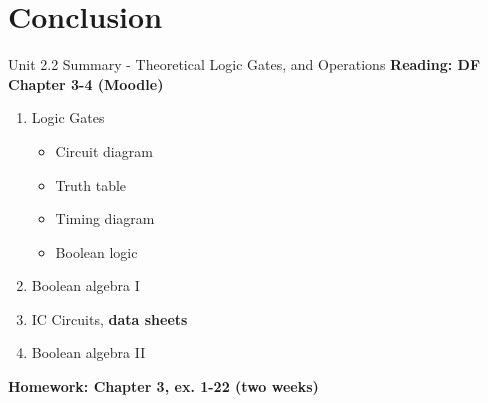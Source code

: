 \documentclass{beamer}
\begin{document}
\section{Conclusion}

\begin{frame}{Unit 2.2 Summary - Theoretical Logic Gates, and Operations}
\textbf{Reading: DF Chapter 3-4 (Moodle)}
\begin{enumerate}
\item Logic Gates
\begin{itemize}
\item Circuit diagram
\item Truth table
\item Timing diagram
\item Boolean logic
\end{itemize}
\item \alert{Boolean algebra I}
\item IC Circuits, \textbf{data sheets}
\item \alert{Boolean algebra II}
\end{enumerate}
\textbf{Homework: Chapter 3, ex. 1-22 (two weeks)}
\end{frame}
\end{document}
